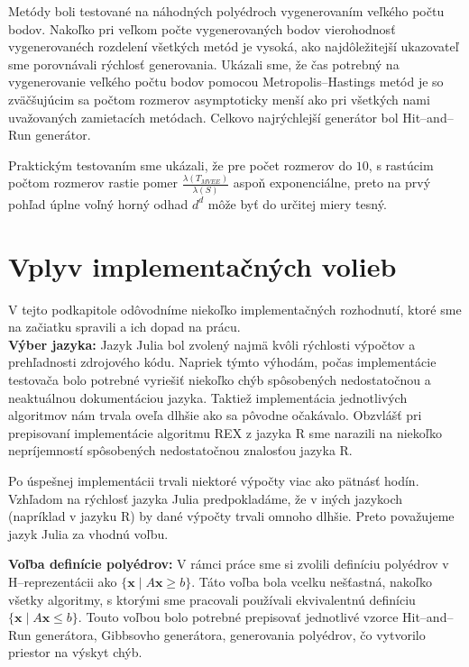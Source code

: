 Metódy boli testované na náhodných polyédroch vygenerovaním veľkého počtu bodov. Nakoľko pri veľkom počte vygenerovaných bodov vierohodnosť vygenerovanéch rozdelení všetkých metód je vysoká, ako najdôležitejší ukazovateľ sme porovnávali rýchlosť generovania.
Ukázali sme, že čas potrebný na vygenerovanie veľkého počtu bodov pomocou Metropolis--Hastings metód je so zväčšujúcim sa počtom rozmerov asymptoticky menší ako pri všetkých nami uvažovaných zamietacích metódach. Celkovo najrýchlejší generátor bol Hit--and--Run generátor.

Praktickým testovaním sme ukázali, že pre počet rozmerov do $10$, s rastúcim počtom rozmerov rastie pomer $\frac{\lambda(T_{MVEE})}{\lambda(S)}$ aspoň exponenciálne, preto na prvý pohľad úplne voľný horný odhad $d^d$ môže byť do určitej miery tesný.\\

\section{Vplyv implementačných volieb}

V tejto podkapitole odôvodníme niekoľko implementačných rozhodnutí, ktoré sme na začiatku spravili a ich dopad na prácu.\\

\textbf{Výber jazyka:} Jazyk Julia bol zvolený najmä kvôli rýchlosti výpočtov a prehľadnosti zdrojového kódu. Napriek týmto výhodám, počas implementácie testovača bolo potrebné vyriešiť niekoľko chýb spôsobených nedostatočnou a neaktuálnou dokumentáciou jazyka. Taktiež implementácia jednotlivých algoritmov nám trvala oveľa dlhšie ako sa pôvodne očakávalo. Obzvlášť pri prepisovaní implementácie algoritmu REX z jazyka R \cite{rex_harman} sme narazili na niekoľko nepríjemností spôsobených nedostatočnou znalosťou jazyka R.

Po úspešnej implementácii trvali niektoré výpočty viac ako pätnásť hodín. Vzhľadom na rýchlosť jazyka Julia predpokladáme, že v iných jazykoch (napríklad v jazyku R) by dané výpočty trvali omnoho dlhšie. Preto považujeme jazyk Julia za vhodnú voľbu.

\textbf{Voľba definície polyédrov:} V rámci práce sme si zvolili definíciu polyédrov v H--reprezentácii ako $\{ \mathbf x \; | \; A \mathbf x \geq b \}$. Táto voľba bola vcelku nešťastná, nakoľko všetky algoritmy, s ktorými sme pracovali používali ekvivalentnú definíciu $\{ \mathbf x \; | \; A \mathbf x \leq b \}$. Touto voľbou bolo potrebné prepisovať jednotlivé vzorce Hit--and--Run generátora, Gibbsovho generátora, generovania polyédrov, čo vytvorilo priestor na výskyt chýb.

